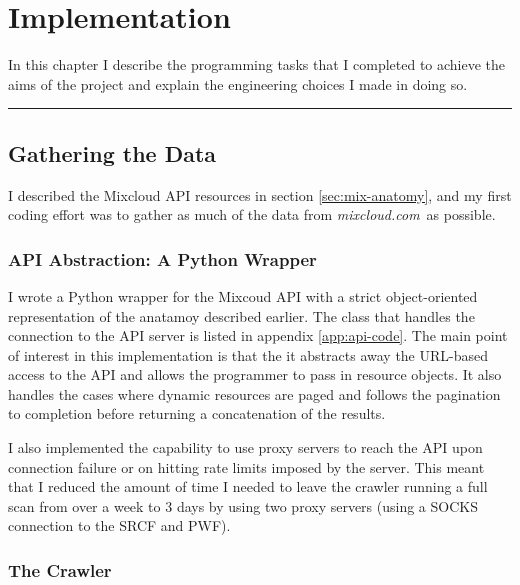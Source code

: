 \documentclass[a4paper,12pt,twoside,notitlepage]{report}
\def\mixurl{\emph{mixcloud.com}}
\newcommand{\rulewidth}{300pt}
\newcommand{\halfrule}{
  \begin{center}
    {\rule{\rulewidth}{0.5pt}}
  \end{center}}
\begin{document}
\chapter{Implementation}

In this chapter I describe the programming tasks that I completed to achieve the
aims of the project and explain the engineering choices I made in doing so. 

\halfrule

\section{Gathering the Data}

I described the Mixcloud API resources in section \ref{sec:mix-anatomy}, and my
first coding effort was to gather as much of the data from \mixurl\ as possible.

\subsection{API Abstraction: A Python Wrapper}

I wrote a Python wrapper for the Mixcoud API with a strict object-oriented
representation of the anatamoy described earlier. The class that handles the
connection to the API server is listed in appendix \ref{app:api-code}. The main
point of interest in this implementation is that the it abstracts away the
URL-based access to the API and allows the programmer to pass in resource
objects. It also handles the cases where dynamic resources are paged and
follows the pagination to completion before returning a concatenation of the
results.

I also implemented the capability to use proxy servers to reach the API upon
connection failure or on hitting rate limits imposed by the server. This meant
that I reduced the amount of time I needed to leave the crawler running a full
scan from over a week to 3 days by using two proxy servers (using a SOCKS
connection to the SRCF and PWF).

\subsection{The Crawler}
\end{document}
